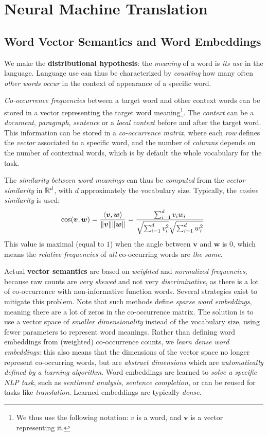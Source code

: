 \section{Neural Machine Translation}
\subsection{Word Vector Semantics and Word Embeddings}
We make the \textbf{distributional hypothesis}: the \emph{meaning} of a word is \emph{its use} in the language.
Language use can thus be characterized by \emph{counting} how many often \emph{other words occur} in the context of appearance of a specific word.

\emph{Co-occurrence frequencies} between a target word and other context words can be stored in a vector representing the target word meaning\footnote{We thus use the following notation: \(v\) is a word, and \(\bm{v}\) is a vector representing it.}.
The \emph{context} can be a \emph{document}, \emph{paragraph}, \emph{sentence} or a \emph{local context} before and after the target word.
This information can be stored in a \emph{co-occurrence matrix}, where each \emph{row} defines the \emph{vector} associated to a specific word, and the number of \emph{columns} depends on the number of contextual words, which is by default the whole vocabulary for the task.

The \emph{similarity between word meanings} can thus be \emph{computed} from the \emph{vector similarity} in \(\mathbb{R}^d\), with \(d\) approximately the vocabulary size.
Typically, the \emph{cosine similarity} is used:
\[
\cos(\bm{v}, \bm{w}) = \frac{\langle \bm{v}, \bm{w}\rangle}{{\left\lVert\bm{v}\right\rVert}{\left\lVert\bm{w}\right\rVert}} = \frac{\sum_{i = 1}^d v_i w_i}{\sqrt{\sum_{i=1}^d v_i^2} \sqrt{\sum_{i=1}^d w_i^2}}.
\]
This value is maximal (equal to \(1\)) when the angle between \(\bm{v}\) and \(\bm{w}\) is \(0\), which means the \emph{relative frequencies} of \emph{all} co-occurring words are \emph{the same}.

Actual \textbf{vector semantics} are based on \emph{weighted} and \emph{normalized frequencies}, because raw counts are \emph{very skewed} and not very \emph{discriminative}, as there is a lot of co-occurrence with non-informative function words.
Several strategies exist to mitigate this problem.
Note that such methods define \emph{sparse word embeddings}, meaning there are a lot of zeros in the co-occurrence matrix.
The solution is to use a vector space of \emph{smaller dimensionality} instead of the vocabulary size, using fewer parameters to represent word meanings.
Rather than defining word embeddings from (weighted) co-occurrence counts, we \emph{learn dense word embeddings}: this also means that the dimensions of the vector space no longer represent co-occurring words, but are \emph{abstract dimensions} which are \emph{automatically defined by a learning algorithm}.
Word embeddings are learned to \emph{solve a specific NLP task}, such as \emph{sentiment analysis}, \emph{sentence completion}, or can be reused for tasks like \emph{translation}.
Learned embeddings are typically \emph{dense}.

